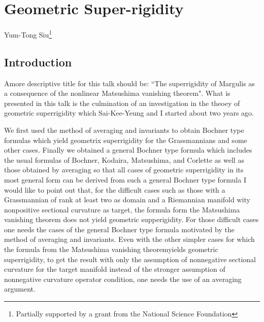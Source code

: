 \chapter{Geometric Super-rigidity}\label{chap16}

\begin{center}
Yum-Tong Siu\footnote{Partially supported by a grant from the National Science Foundation}
\end{center}



\section*{Introduction}

\setcounter{pageoriginal}{298}
A\pageoriginale more descriptive title for this talk should be: ``The superrigidity of Margulis as a consequence of the nonlinear Matsushima vanishing theorem". What is presented in this talk is the culmination of an investigation in the theoey of geometric superrigidity which Sai-Kee-Yeung and I started about two years ago.

We first used the method of averaging and invariants to obtain Boch\-ner type formulas which yield geometrix superrigidity for the Grassmannians and some other cases. Finally we obtained a general Bochner type formula which includes the usual formulas of Bochner, Kodaira, Matsushima, and Corlette as well as those obtained by averaging so that all cases of geometric superrigidity in its most general form can be derived from such a general Bochner type formula I would like to point out that, for the difficult cases such as those with a Grassmannian of rank at least two as domain and a Riemannian manifold wity nonpositive sectional curvature as target, the formula form the Matsushima vanishing theorem does not yield geometric supperigidity. For those difficult cases one needs the cases of the general Bochner type formula motivated by the method of averaging and invariants. Even with the other simpler cases for which the formula from the Matsushima vanishing theorem\pageoriginale yields geometric superrigidity, to get the result with only the assumption of nonnegative sectional curvature for the target manifold instead of the stronger assumption of nonnegative curvature operator condition, one needs the use of an averaging argument.

\newpage

